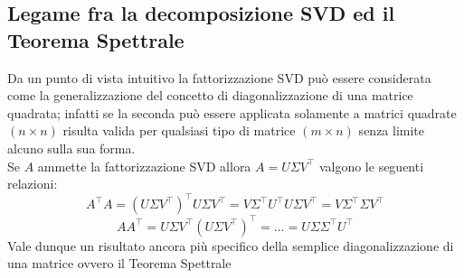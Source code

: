\documentclass[11pt]{article}
\begin{document}
\subsection{Legame fra la decomposizione SVD ed il Teorema Spettrale}
Da un punto di vista intuitivo la fattorizzazione SVD può essere considerata come la generalizzazione del concetto di diagonalizzazione di una matrice quadrata; infatti se la seconda può essere applicata solamente a matrici quadrate $(n \times n)$ risulta valida per qualsiasi tipo di matrice $(m \times n)$ senza limite alcuno sulla sua forma.\\
Se $A$ ammette la fattorizzazione SVD allora $A=U\Sigma V^\top      $ valgono le seguenti relazioni: $$A^\top      A=(U\Sigma V^\top      )^\top      U\Sigma V^\top      =V\Sigma^\top      U^\top      U\Sigma V^\top      =V\Sigma^\top       \Sigma V^\top      $$
$$ AA^\top      =U\Sigma V^\top      (U\Sigma V^\top      )^\top      =\dots=U\Sigma \Sigma^\top       U^\top      $$ 
Vale dunque un risultato ancora più specifico della semplice diagonalizzazione di una matrice ovvero il Teorema Spettrale
\end{document}
